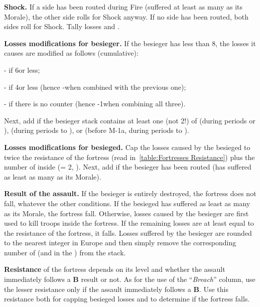 \textbf{Shock.} If a side has been routed during Fire (suffered at least as
many \textetoile as its Morale), the other side rolls for Shock anyway. If no
side has been routed, both sides roll for Shock. Tally losses and \textetoile.

\textbf{Losses modifications for besieger.} If the besieger has less than
8\LD, the losses it causes are modified as follows (cumulative):
\begin{modlist}
\item[-\texttu] if 6\LD or less;
\item[-\texttu] if 4\LD or less (hence -\texttd when combined with the
  previous one);
\item[-\texttd] if there is no \ARMY counter (hence -1\texttu when combining
  all three).
\end{modlist}
Next, add \texttd if the besieger stack contains at least one \ARMY\faceplus
(not 2\ARMY\facemoins !) of \POL (during periods  or ),
\RUS (during periods  to ), or \TUR \Janissaire (before
M-1a, during periods  to ).


\textbf{Losses modifications for besieged.} Cap the losses caused by the
besieged to twice the resistance of the fortress (read
in~\ref{table:Fortresses Resistance}) plus the number of \LD inside
(\ARMY\facemoins = 2\LD, \ARMY{}\LD). Next, add \texttd if the
besieger has been routed (has suffered as least as many \textetoile as its
Morale).

\textbf{Result of the assault.} If the besieger is entirely destroyed, the
fortress does not fall, whatever the other conditions. If the besieged has
suffered as least as many \textetoile as its Morale, the fortress
fall. Otherwise, losses caused by the besieger are first used to kill troops
inside the fortress. If the remaining losses are at least equal to the
resistance of the fortress, it falls. Losses suffered by the besieger are
rounded to the nearest integer in Europe and then simply remove the
corresponding number of \LD (and \LDE in the \ROTW) from the stack.

\textbf{Resistance} of the fortress depends on its level and whether the
assault immediately follows a \textbf{B} result or not. As for the use of the
``\emph{Breach}'' column, use the lesser resistance only if the assault
immediately follows a \textbf{B}. Use this resistance both for capping
besieged losses and to determine if the fortress falls.

